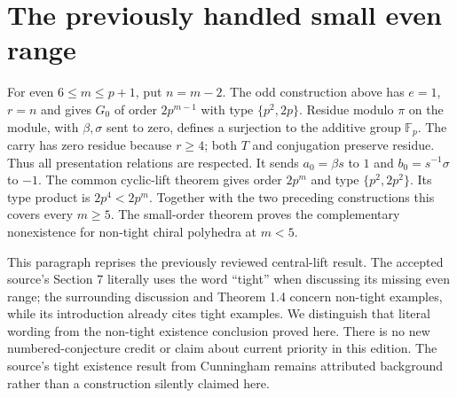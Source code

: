 \section{The previously handled small even range}
For even $6\leq m\leq p+1$, put $n=m-2$. The odd construction
above has $e=1$, $r=n$ and gives $G_0$ of order $2p^{m-1}$
with type $\{p^2,2p\}$. Residue modulo $\pi$ on the module,
with $\beta,\sigma$ sent to zero, defines a surjection to the
additive group $\mathbb F_p$. The carry has zero residue because
$r\geq4$; both $T$ and conjugation preserve residue. Thus all
presentation relations are respected. It sends $a_0=\beta s$ to
$1$ and $b_0=s^{-1}\sigma$ to $-1$.
The common cyclic-lift theorem gives order $2p^m$ and type
$\{p^2,2p^2\}$. Its type product is $2p^4<2p^m$.
Together with the two preceding constructions this covers every
$m\geq5$. The small-order theorem proves the complementary
nonexistence for non-tight chiral polyhedra at $m<5$.

This paragraph reprises the previously reviewed central-lift result.
The accepted source's Section 7 literally uses the word ``tight''
when discussing its missing even range; the surrounding discussion
and Theorem 1.4 concern non-tight examples, while its introduction
already cites tight examples. We distinguish that literal wording
from the non-tight existence conclusion proved here. There is no new
numbered-conjecture credit or claim about current priority in this
edition. The source's tight existence result from Cunningham remains
attributed background rather than a construction silently claimed here.
